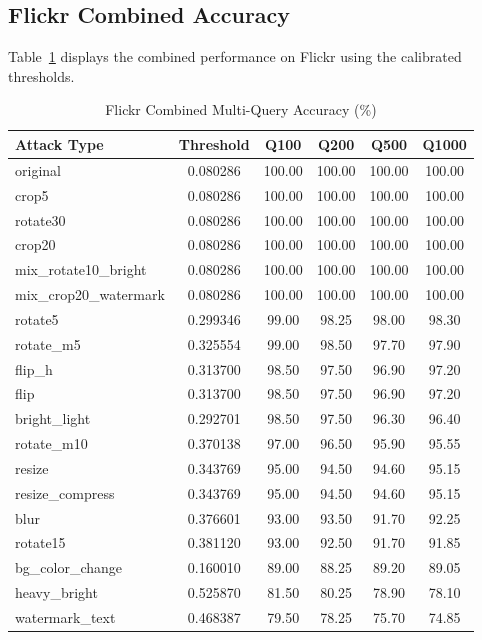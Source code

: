 \documentclass[11pt,a4paper]{article}
\begin{document}
\subsection{Flickr Combined Accuracy}
Table~\ref{tab:flickr_combined} displays the combined performance on Flickr using the calibrated thresholds.

\begin{table}[H]
\centering
\small
\renewcommand{\arraystretch}{0.85}
\caption{Flickr Combined Multi-Query Accuracy (\%)}
\label{tab:flickr_combined}
\begin{tabular}{lccccc}
\toprule
\textbf{Attack Type} & \textbf{Threshold} & \textbf{Q100} & \textbf{Q200} & \textbf{Q500} & \textbf{Q1000} \\
\midrule
original & 0.080286 & 100.00 & 100.00 & 100.00 & 100.00 \\
crop5 & 0.080286 & 100.00 & 100.00 & 100.00 & 100.00 \\
rotate30 & 0.080286 & 100.00 & 100.00 & 100.00 & 100.00 \\
crop20 & 0.080286 & 100.00 & 100.00 & 100.00 & 100.00 \\
mix\_rotate10\_bright & 0.080286 & 100.00 & 100.00 & 100.00 & 100.00 \\
mix\_crop20\_watermark & 0.080286 & 100.00 & 100.00 & 100.00 & 100.00 \\
rotate5 & 0.299346 & 99.00 & 98.25 & 98.00 & 98.30 \\
rotate\_m5 & 0.325554 & 99.00 & 98.50 & 97.70 & 97.90 \\
flip\_h & 0.313700 & 98.50 & 97.50 & 96.90 & 97.20 \\
flip & 0.313700 & 98.50 & 97.50 & 96.90 & 97.20 \\
bright\_light & 0.292701 & 98.50 & 97.50 & 96.30 & 96.40 \\
rotate\_m10 & 0.370138 & 97.00 & 96.50 & 95.90 & 95.55 \\
resize & 0.343769 & 95.00 & 94.50 & 94.60 & 95.15 \\
resize\_compress & 0.343769 & 95.00 & 94.50 & 94.60 & 95.15 \\
blur & 0.376601 & 93.00 & 93.50 & 91.70 & 92.25 \\
rotate15 & 0.381120 & 93.00 & 92.50 & 91.70 & 91.85 \\
bg\_color\_change & 0.160010 & 89.00 & 88.25 & 89.20 & 89.05 \\
heavy\_bright & 0.525870 & 81.50 & 80.25 & 78.90 & 78.10 \\
watermark\_text & 0.468387 & 79.50 & 78.25 & 75.70 & 74.85 \\

\end{tabular}
\end{table}
\end{document}
